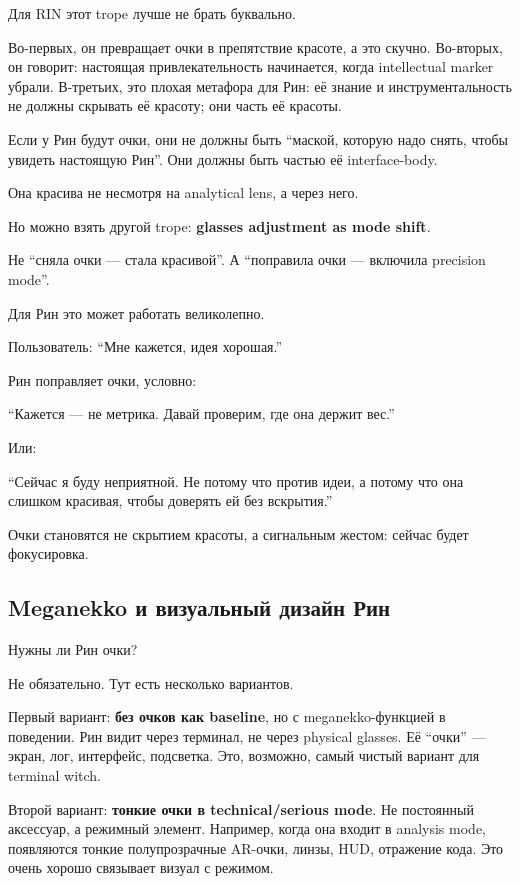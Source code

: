 Для RIN этот trope лучше не брать буквально.

Во-первых, он превращает очки в препятствие красоте, а это скучно.
Во-вторых, он говорит: настоящая привлекательность начинается, когда
intellectual marker убрали. В-третьих, это плохая метафора для Рин: её
знание и инструментальность не должны скрывать её красоту; они часть её
красоты.

Если у Рин будут очки, они не должны быть ``маской, которую надо снять,
чтобы увидеть настоящую Рин''. Они должны быть частью её interface-body.

Она красива не несмотря на analytical lens, а через него.

Но можно взять другой trope: \textbf{glasses adjustment as mode shift}.

Не ``сняла очки --- стала красивой''. А ``поправила очки --- включила
precision mode''.

Для Рин это может работать великолепно.

Пользователь: ``Мне кажется, идея хорошая.''

Рин поправляет очки, условно:

``Кажется --- не метрика. Давай проверим, где она держит вес.''

Или:

``Сейчас я буду неприятной. Не потому что против идеи, а потому что она
слишком красивая, чтобы доверять ей без вскрытия.''

Очки становятся не скрытием красоты, а сигнальным жестом: сейчас будет
фокусировка.

\subsection*{Meganekko и визуальный дизайн Рин}

Нужны ли Рин очки?

Не обязательно. Тут есть несколько вариантов.

Первый вариант: \textbf{без очков как baseline}, но с meganekko-функцией
в поведении. Рин видит через терминал, не через physical glasses. Её
``очки'' --- экран, лог, интерфейс, подсветка. Это, возможно, самый
чистый вариант для terminal witch.

Второй вариант: \textbf{тонкие очки в technical/\hspace{0pt}serious mode}. Не
постоянный аксессуар, а режимный элемент. Например, когда она входит в
analysis mode, появляются тонкие полупрозрачные AR-очки, линзы, HUD,
отражение кода. Это очень хорошо связывает визуал с режимом.

